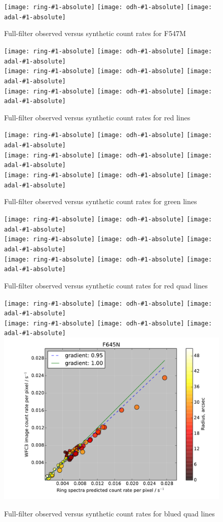 \documentclass[preprint, 10pt]{aastex}
\begin{document}
\newcommand\multicorrel[2]{
    \texttt{[image: ring-\#1-absolute]}%
    \texttt{[image: odh-\#1-absolute]}%
    \texttt{[image: adal-\#1-absolute]}%
}

\begin{figure}[p]
  \centering
  \multicorrel{F547M}{green}
  \caption{Full-filter observed versus synthetic count rates for F547M}
  \label{fig:multicorrel-continuum}
\end{figure}

\begin{figure}[p]
  \centering
  \multicorrel{F658N}{red}\\
  \multicorrel{F656N}{red}\\
  \multicorrel{F673N}{red}
  \caption{Full-filter observed versus synthetic count rates for red lines}
  \label{fig:multicorrel-red}
\end{figure}

\begin{figure}[p]
  \centering
  \multicorrel{F502N}{green}\\
  \multicorrel{F487N}{green}\\
  \multicorrel{F469N}{green}
  \caption{Full-filter observed versus synthetic count rates for green lines}
  \label{fig:multicorrel-green}
\end{figure}

\begin{figure}[p]
  \centering
  \multicorrel{FQ575N}{red}\\
  \multicorrel{FQ672N}{red}\\
  \multicorrel{FQ674N}{red}\\
  \caption{Full-filter observed versus synthetic count rates for red quad lines}
  \label{fig:multicorrel-red-quad}
\end{figure}
\begin{figure}[p]
  \centering
  \multicorrel{FQ437N}{blue}\\
  \multicorrel{FQ436N}{blue}\\
  \includegraphics[width=0.33\linewidth]{ring-F645N-absolute}%
  \caption{Full-filter observed versus synthetic count rates for blued quad lines}
  \label{fig:multicorrel-blue-quad}
\end{figure}
\end{document}
